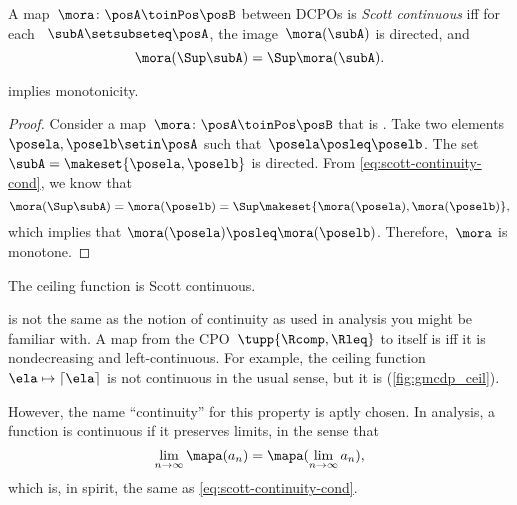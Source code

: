 \begin{definition}
    \label{def:scott}
    A map~$\mora\colon\posA\toinPos\posB$ between DCPOs is \emph{Scott continuous} iff for each ~$\subA\setsubseteq\posA$, the image~$\mora(\subA)$ is directed, and
    \begin{equation}
        \label{eq:scott-continuity-cond}
        \mora(\Sup \subA)=\Sup \mora(\subA).
    \end{equation}
\end{definition}
\begin{lemma}
     implies monotonicity.
\end{lemma}
\begin{proof}
    Consider a map~$\mora\colon\posA\toinPos\posB$ that is .
    Take two elements~$\posela, \poselb \setin \posA$ such that~$\posela\posleq\poselb$.
    The set~$ \subA =  \makeset{\posela, \poselb}$ is directed.
    From \cref{eq:scott-continuity-cond}, we know that
    \begin{equation}
        \mora(\Sup \subA) = \mora(\poselb) = \Sup \makeset{\mora(\posela), \mora(\poselb)},
    \end{equation}
    which implies that $\mora(\posela) \posleq \mora(\poselb)$.
    Therefore,~$\mora$ is monotone.
\end{proof}

\begin{marginfigure}
    \caption{The ceiling function is Scott continuous.}
    \label{fig:gmcdp_ceil}
\end{marginfigure}

\begin{remark}
     is not the same as the notion of continuity as used in analysis you might be familiar with.
    A map from the CPO~$\tupp{\Rcomp,\Rleq}$ to itself is  iff it is nondecreasing and left-continuous.
    For example, the ceiling function~$\ela \mapsto\left\lceil \ela\right\rceil $ is not continuous in the usual sense, but it is  (\cref{fig:gmcdp_ceil}).

    However, the name ``continuity'' for this property is aptly chosen.
    In analysis, a function is continuous if it preserves limits, in the sense that
    \begin{equation}
        \lim_{n\to\infty}\mapa(a_n) = \mapa(\lim_{n\to\infty}a_n),
    \end{equation}
    which is, in spirit, the same as \cref{eq:scott-continuity-cond}.
\end{remark}

